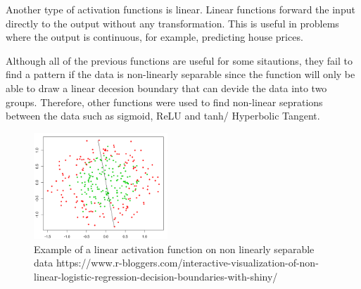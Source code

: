 \documentclass[runningheads]{llncs}
\begin{document}
Another type of activation functions is linear. 
Linear functions forward the input directly to the output without any transformation.
This is useful in problems where the output is continuous, for example, predicting house prices.

Although all of the previous functions are useful for some sitautions, 
they fail to find a pattern if the data is non-linearly separable
since the function will only be able to draw a linear decesion boundary that can devide the data into two groups.
Therefore, other functions were used to find non-linear seprations between the data such as sigmoid, ReLU and tanh/ Hyperbolic Tangent. 

\begin{figure}
    \includegraphics[height=4cm]{linear}
    \caption{Example of a linear activation function on non linearly separable data
    https://www.r-bloggers.com/interactive-visualization-of-non-linear-logistic-regression-decision-boundaries-with-shiny/}
\end{figure}
\end{document}
